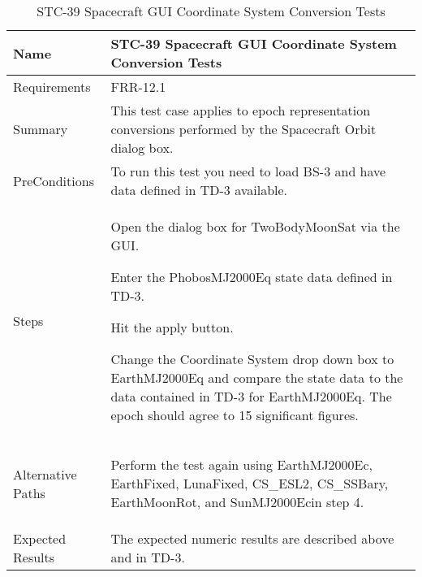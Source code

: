 \begin{table}[htbp!]
\centering
      \begin{tabular}{|p{1.05 in} |p{4.75 in} |}
      \hline
         \rowcolor[rgb]{0.8,0.8,0.8} Name & STC-39 Spacecraft GUI Coordinate System Conversion Tests\\
         \hline
         Requirements & FRR-12.1\\ \hline
         Summary &
         This test case applies to epoch representation conversions performed by the Spacecraft Orbit dialog box.  \\
         \hline
         PreConditions & To run this test you need to load BS-3 and have data defined in TD-3 available.\\
         \hline
         Steps &
         \begin{compactenum}
         \item Open the dialog box for TwoBodyMoonSat via the GUI.
         \item Enter the PhobosMJ2000Eq state data  defined in TD-3.
         \item Hit the apply button.
         \item Change the Coordinate System drop down box to EarthMJ2000Eq and compare the state data to
               the data contained in TD-3 for EarthMJ2000Eq. The epoch should agree to 15 significant
               figures.
         \end{compactenum}\\
		 \hline
         Alternative Paths &
         \begin{compactenum}
         \item Perform the test again using  EarthMJ2000Ec, EarthFixed, LunaFixed, CS\_ESL2, CS\_SSBary, EarthMoonRot, and SunMJ2000Ecin step 4.
         \end{compactenum}\\
         \hline
         Expected Results & The expected numeric results are described above and in TD-3.\\
      \hline
\end{tabular}
      \label{Table:STC-39}
      \caption{STC-39 Spacecraft GUI Coordinate System Conversion Tests}
\end{table} 